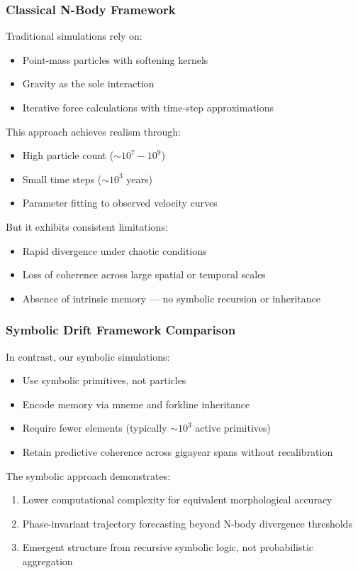 \documentclass[12pt]{article}
\begin{document}
\subsubsection{Classical N-Body Framework}

Traditional simulations rely on:
\begin{itemize}[noitemsep]
  \item Point-mass particles with softening kernels
  \item Gravity as the sole interaction
  \item Iterative force calculations with time-step approximations
\end{itemize}

This approach achieves realism through:
\begin{itemize}[noitemsep]
  \item High particle count (\( \sim 10^7 - 10^9 \))
  \item Small time steps (\( \sim 10^3 \) years)
  \item Parameter fitting to observed velocity curves
\end{itemize}

But it exhibits consistent limitations:
\begin{itemize}[noitemsep]
  \item Rapid divergence under chaotic conditions
  \item Loss of coherence across large spatial or temporal scales
  \item Absence of intrinsic memory — no symbolic recursion or inheritance
\end{itemize}

\subsubsection{Symbolic Drift Framework Comparison}

In contrast, our symbolic simulations:
\begin{itemize}[noitemsep]
  \item Use symbolic primitives, not particles
  \item Encode memory via mneme and forkline inheritance
  \item Require fewer elements (typically \( \sim 10^3 \) active primitives)
  \item Retain predictive coherence across gigayear spans without recalibration
\end{itemize}

The symbolic approach demonstrates:
\begin{enumerate}[noitemsep]
  \item Lower computational complexity for equivalent morphological accuracy
  \item Phase-invariant trajectory forecasting beyond N-body divergence thresholds
  \item Emergent structure from recursive symbolic logic, not probabilistic aggregation
\end{enumerate}
\end{document}
